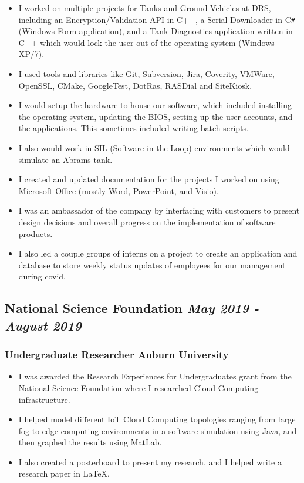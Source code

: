 \documentclass{article}
\begin{document}
\begin{itemize}
    \item I worked on multiple projects for Tanks and Ground Vehicles 
    at DRS, including an Encryption/Validation API in C++, a Serial Downloader in 
     C\verb|#| (Windows Form application), and a Tank Diagnostics 
     application written in C++ which would lock the user out of 
     the operating system (Windows XP/7).
    \item I used tools and libraries like Git,
    Subversion, Jira, Coverity, VMWare, OpenSSL, CMake, GoogleTest, 
    DotRas, RASDial and SiteKiosk.
    \item I would setup the hardware to house our software, 
     which included installing the operating system, updating the BIOS,
     setting up the user accounts, and the applications. This sometimes
     included writing batch scripts.
    \item I also would work in SIL (Software-in-the-Loop) environments which
     would simulate an Abrams tank.
    \item I created and updated documentation for the projects I worked on
     using Microsoft Office (mostly Word, PowerPoint, and Visio).
    \item I was an ambassador of the company by interfacing with customers
     to present design decisions and overall progress on the implementation
     of software products.
    \item I also led a couple groups of interns on a project to create 
    an application and database to store weekly status updates of employees
    for our management during covid.
    
\end{itemize}

\subsection*{\hspace*{0.15cm} National Science Foundation \hfill \textit{May 2019 - August 2019}}

\subsubsection*{\hspace*{0.15cm} Undergraduate Researcher \hfill Auburn University}

\begin{itemize}
    \item I was awarded the Research Experiences for Undergraduates grant from 
    the National Science Foundation where I researched Cloud Computing infrastructure.
    \item I helped model different IoT Cloud Computing topologies ranging from large
     fog to edge computing environments in a software simulation using Java, and
     then graphed the results using MatLab.
    \item I also created a posterboard to present my research, and I helped
     write a research paper in {\LaTeX}.
    
\end{itemize}
\end{document}
